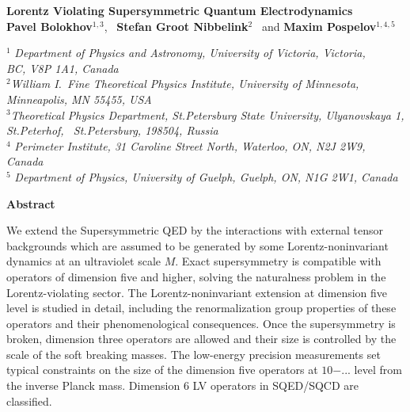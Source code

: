 \documentclass[12pt]{revtex4}
\begin{document}
\begin{titlepage}
\renewcommand{\thefootnote}{\fnsymbol{footnote}}

\begin{center}
\vspace{0.5cm}

\large {\bf Lorentz Violating Supersymmetric Quantum Electrodynamics}\\[3mm]
  
\vspace*{0.5cm}
\normalsize
{\bf Pavel Bolokhov}$^{1,3}$, ~{\bf Stefan Groot Nibbelink}$^{2}$
\ and
{\bf Maxim Pospelov}$^{1,4,5}$%

\vspace*{0.5cm}
$^{1}$ {\it Department of Physics and Astronomy,
University of Victoria, Victoria,\\ BC, V8P 1A1, Canada}\\
$^{2}${\it William I.\ Fine Theoretical Physics Institute,
University of Minnesota,\\ Minneapolis, MN 55455, USA}\\
$^{3}${\it Theoretical Physics Department, St.Petersburg State University, Ulyanovskaya 1,\\
St.Peterhof, ~St.Petersburg, 198504, Russia}\\
$^{4}$ {\it Perimeter Institute, 31 Caroline Street North,
Waterloo, ON,  N2J 2W9,
Canada}\\
$^{5}$ {\it Department of Physics,
 University of Guelph,
 Guelph, ON,  N1G 2W1, Canada}
 \end{center}

\centerline{\large\bf Abstract}
We extend the Supersymmetric QED by the interactions with external 
tensor backgrounds which are assumed to be generated by some Lorentz-noninvariant 
dynamics at an ultraviolet scale $M$. Exact supersymmetry is compatible with operators 
of dimension five and higher, solving the naturalness problem in the 
Lorentz-violating sector. The Lorentz-noninvariant extension at 
dimension five level is studied in detail, including the 
renormalization group properties of these 
operators and their phenomenological consequences. 
Once the supersymmetry is broken, dimension three operators are 
allowed and their size is controlled by the scale of the 
soft breaking masses. The low-energy precision measurements 
set typical constraints on the size of the dimension 
five operators at $10{-...}$ level from the inverse Planck mass. 
Dimension 6 LV operators in SQED/SQCD are classified.



\end{titlepage}
\end{document}
